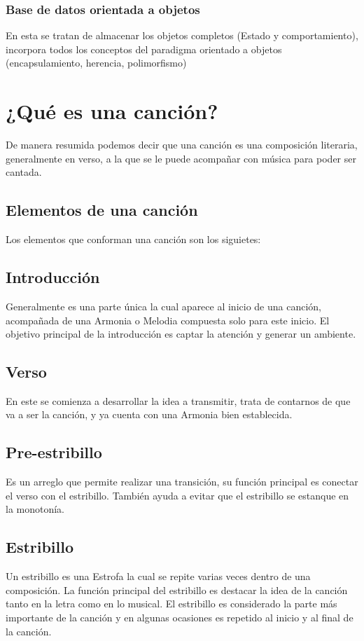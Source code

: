 \documentclass[12pt, a4paper, titlepage]{report}
\begin{document}
				\subsubsection{Base de datos orientada a objetos}
				En esta se tratan de almacenar los objetos completos (\Gls{Estado} y comportamiento), incorpora todos los conceptos del paradigma orientado a objetos (encapsulamiento, herencia, polimorfismo)\par
		  
	    \section{¿Qué es una canción?}
	    De manera resumida podemos decir que una canción es una composición literaria, generalmente en verso, a la que se le puede acompañar con música para poder ser cantada.\cite{refEstructuraCancion1}\par
			\subsection{Elementos de una canción}
			Los elementos que conforman una canción son los siguietes:
			\subsection{Introducción}
			Generalmente es una parte única la cual aparece al inicio de una canción, acompañada de una \Gls{Armonia} o \Gls{Melodia} compuesta solo para este inicio. El objetivo principal de la introducción es captar la atención y generar un ambiente.\cite{refEstructuraCancion2}\par
			\subsection{Verso}
			En este se comienza a desarrollar la idea a transmitir, trata de contarnos de que va a ser la canción, y ya cuenta con una \Gls{Armonia}  bien establecida.\par
			\subsection{Pre-estribillo}
			Es un arreglo que permite realizar una transición, su función principal es conectar el verso con el estribillo. También ayuda a evitar que el estribillo se estanque en la monotonía.\par
			\subsection{Estribillo}
			Un estribillo es una \Gls{Estrofa} la cual se repite varias veces dentro de una composición. La función principal del estribillo es destacar la idea de la canción tanto en la letra como en lo musical. El estribillo es considerado la parte más importante de la canción y en algunas ocasiones es repetido al inicio y al final de la canción.\par
\end{document}
